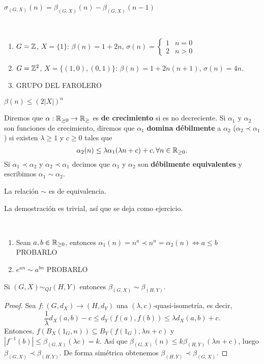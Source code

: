 \documentclass[twoside, 11pt]{article}
\begin{document}
\begin{observacion}
$\sigma_{(G,X)}(n)=\beta_{(G,X)}(n)-\beta_{(G,X)}(n-1)$
\end{observacion}

\begin{ejs}\
\begin{enumerate}
\item $G=\mathbb{Z}$, $X=\{1\}$: $\beta(n)=1+2n$, $\sigma(n)=\begin{cases}
1 & n=0\\
2 & n>0
\end{cases}$
\item $G=\mathbb{Z}^2$, $X=\{(1,0),(0,1)\}$: $\beta(n)=1+2n(n+1)$, $\sigma(n)=4n$. 
\item GRUPO DEL FAROLERO
\end{enumerate}
\end{ejs}

\begin{observacion}
$\beta(n)\leq (2|X|)^n$
\end{observacion}

\begin{defi}
Diremos que $\alpha:\mathbb{R}_{\geq 0}\to\mathbb{R}_{\geq }$ es \textbf{de crecimiento} si es no decreciente. Si $\alpha_1$ y $\alpha_2$ son funciones de crecimiento, diremos que $\alpha_1$ \textbf{domina débilmente} a $\alpha_2$ ($\alpha_2\prec \alpha_1$) si existen $\lambda\geq 1$ y $c\geq 0$ tales que
\[
\alpha_2(n)\leq \lambda\alpha_1(\lambda n+c)+c, \forall n\in\mathbb{R}_{\geq 0}.
\]
Si $\alpha_1\prec\alpha_2$ y $\alpha_2\prec\alpha_1$ decimos que $\alpha_1$ y $\alpha_2$ son \textbf{débilmente equivalentes} y escribimos $\alpha_1\sim\alpha_2$.
\end{defi}

\begin{lemma}
La relación $\sim$ es de equivalencia.
\end{lemma}
La demostración es trivial, así que se deja como ejercicio.

\begin{ejs}\
\begin{enumerate}
\item Sean $a,b\in\mathbb{R}_{\geq 0}$, entonces $\alpha_1(n)=n^a\prec n^n=\alpha_2(n)\Leftrightarrow a\leq b$ PROBARLO
\item $e^{an}\sim a^{bn}$ PROBARLO
\end{enumerate}
\end{ejs}

\begin{lemma}
Si $(G,X)\sim_{QI} (H,Y)$ entonces $\beta_{(G,X)}\sim\beta_{(H,Y)}$.
\end{lemma}
\begin{proof}
Sea $f:(G,d_X)\to (H,d_Y)$ una $(\lambda,c)$-quasi-isometría, es decir,
\[
\frac{1}{\lambda}d_X(a,b)-c\leq d_Y(f(a),f(b))\leq \lambda d_X(a,b)+c.
\]
Entonces, $f(B_X(1_G,n))\subseteq B_Y(f(1_G),\lambda n+c)$ y $|f^{-1}(b)|\leq \beta_{(G,X)}(\lambda c)=k$. Así que $\beta_{(G,X)}(n)\leq k\beta_{(H,Y)}(\lambda n+c)$, luego $\beta_{(G,X)}\prec \beta_{(H,Y)}$. De forma simétrica obtenemos $\beta_{(H,Y)}\prec \beta_{(G,X)}$.
\end{proof}
\end{document}
